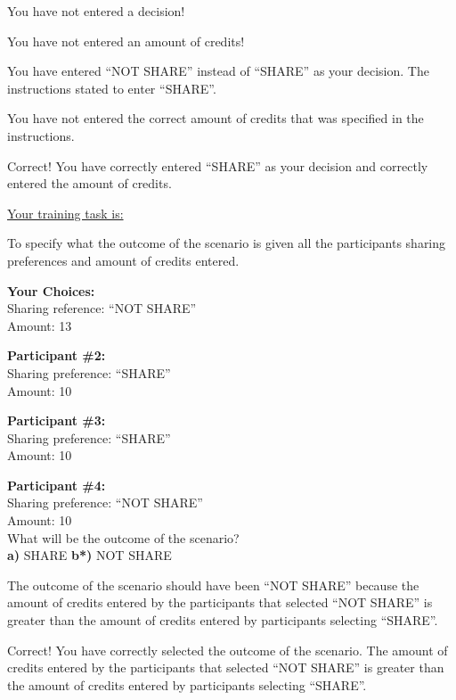 \clearpage
{} You have not entered a decision!

 You have not entered an amount of credits!

 You have entered ``NOT SHARE'' instead of ``SHARE'' as your decision. The instructions stated to enter ``SHARE''.

 You have not entered the correct amount of credits that was specified in the instructions.

 Correct! You have correctly entered ``SHARE'' as your decision and correctly entered the amount of credits.




\underline{Your training task is:} 

To specify what the outcome of the scenario is given all the participants sharing preferences and amount of credits entered.

\textbf{Your Choices:} \\
\indent \indent Sharing reference: 	``NOT SHARE'' \\
\indent \indent Amount:		13 

\textbf{Participant \#2:} \\ 
\indent \indent Sharing preference:	``SHARE'' \\
\indent \indent Amount: 		10

\textbf{Participant \#3:} \\
\indent \indent Sharing preference:	``SHARE'' \\
\indent \indent Amount: 		10

\textbf{Participant \#4:} \\
\indent \indent Sharing preference:	``NOT SHARE'' \\
\indent \indent Amount: 		10 \\ 

What will be the outcome of the scenario? \\
\indent \textbf{a)} SHARE \indent \indent \textbf{b*)} NOT SHARE 

 The outcome of the scenario should have been ``NOT SHARE'' because the amount of credits entered by the participants that selected ``NOT SHARE'' is greater than the amount of credits entered by participants selecting ``SHARE''.

 Correct! You have correctly selected the outcome of the scenario. The amount of credits entered by the participants that selected ``NOT SHARE'' is greater than the amount of credits entered by participants selecting ``SHARE''.


